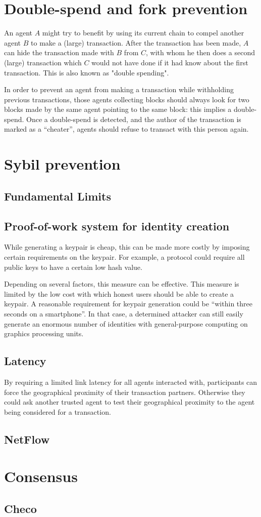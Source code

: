 \section{Double-spend and fork prevention}
An agent $A$ might try to benefit by using its current chain to compel another agent $B$ to make a (large) transaction. After the transaction has been made, $A$ can hide the transaction made with $B$ from $C$, with whom he then does a second (large) transaction which $C$ would not have done if it had know about the first transaction. This is also known as "double spending".

In order to prevent an agent from making a transaction while withholding previous transactions, those agents collecting blocks should always look for two blocks made by the same agent pointing to the same block: this implies a double-spend. Once a double-spend is detected, and the author of the transaction is marked as a ``cheater'', agents should refuse to transact with this person again.

\section{Sybil prevention}
\subsection{Fundamental Limits}

\subsection{Proof-of-work system for identity creation}\label{sssection:chain_creation_cost}
While generating a keypair is cheap, this can be made more costly by imposing certain requirements on the keypair. For example, a protocol could require all public keys to have a certain low hash value.

Depending on several factors, this measure can be effective. This measure is limited by the low cost with which honest users should be able to create a keypair. A reasonable requirement for keypair generation could be ``within three seconds on a smartphone''. In that case, a determined attacker can still easily generate an enormous number of identities with general-purpose computing on graphics processing units.

\subsection{Latency}
By requiring a limited link latency for all agents interacted with, participants can force the geographical proximity of their transaction partners. Otherwise they could ask another trusted agent to test their geographical proximity to the agent being considered for a transaction.

\subsection{NetFlow}

\section{Consensus}
\subsection{Checo}
